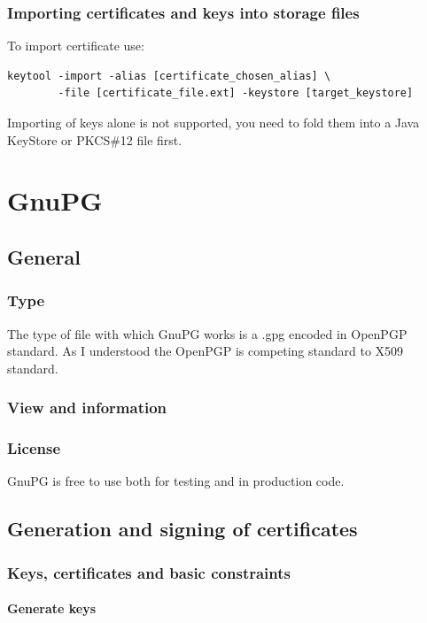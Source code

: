 \documentclass[10pt, a4paper]{report}
\begin{document}
  
  \subsection{Importing certificates and keys into storage files}
To import certificate use:
\begin{verbatim}
keytool -import -alias [certificate_chosen_alias] \
        -file [certificate_file.ext] -keystore [target_keystore]  
\end{verbatim}

Importing of keys alone is not supported, you need to fold them into a Java KeyStore or PKCS\#12 file first.

\chapter{GnuPG}

\section{General}

  \subsection{Type}
The type of file with which GnuPG works is a .gpg encoded in OpenPGP standard. As I understood the OpenPGP is competing standard to X509 standard.  
  \subsection{View and information}
  
  \subsection{License}
GnuPG is free to use both for testing and in production code.
  
\section{Generation and signing of certificates}

  \subsection{Keys, certificates and basic constraints}
  
    \subsubsection{Generate keys}
    
\end{document}

